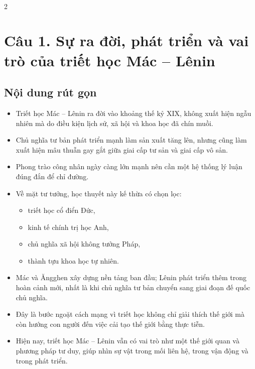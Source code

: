 \documentclass[9pt,a4paper]{extarticle}
\begin{document}
\small
\begin{center}
{\bfseries\fontsize{11}{12}\selectfont }\\[-1pt]
\end{center}

\vspace{-3pt}
\begin{multicols*}{2}

\section*{Câu 1. Sự ra đời, phát triển và vai trò của triết học Mác -- Lênin}
\subsection*{Nội dung rút gọn}
\begin{itemize}
  \item Triết học Mác -- Lênin ra đời vào khoảng thế kỷ XIX, không xuất hiện ngẫu nhiên mà do điều kiện lịch sử, xã hội và khoa học đã chín muồi.
  \item Chủ nghĩa tư bản phát triển mạnh làm sản xuất tăng lên, nhưng cũng làm xuất hiện mâu thuẫn gay gắt giữa giai cấp tư sản và giai cấp vô sản.
  \item Phong trào công nhân ngày càng lớn mạnh nên cần một hệ thống lý luận đúng đắn để chỉ đường.
  \item Về mặt tư tưởng, học thuyết này kế thừa có chọn lọc:
  \begin{itemize}
    \item triết học cổ điển Đức,
    \item kinh tế chính trị học Anh,
    \item chủ nghĩa xã hội không tưởng Pháp,
    \item thành tựu khoa học tự nhiên.
  \end{itemize}
  \item Mác và Ăngghen xây dựng nền tảng ban đầu; Lênin phát triển thêm trong hoàn cảnh mới, nhất là khi chủ nghĩa tư bản chuyển sang giai đoạn đế quốc chủ nghĩa.
  \item Đây là bước ngoặt cách mạng vì triết học không chỉ giải thích thế giới mà còn hướng con người đến việc cải tạo thế giới bằng thực tiễn.
  \item Hiện nay, triết học Mác -- Lênin vẫn có vai trò như một thế giới quan và phương pháp tư duy, giúp nhìn sự vật trong mối liên hệ, trong vận động và trong phát triển.
\end{itemize}


\end{multicols*}
\end{document}
